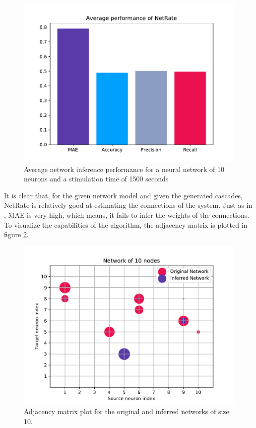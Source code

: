 \begin{figure}
	\centering
	\includegraphics[width=0.8\linewidth]{proof_suitability.pdf}
	\caption{Average network inference performance for a neural network of 10 neurons and a stimulation time of 1500 seconds}
	\label{fig:proof_suitability}
\end{figure}

It is clear that, for the given network model and given the generated cascades, NetRate is relatively good at estimating the connections of the system. Just as in \cite{alexandru2018estimating}, MAE is very high, which means, it fails to infer the weights of the connections. To visualize the capabilities of the algorithm, the adjacency matrix is plotted in figure \ref{fig:adjacency_10_neurons}.\\

\begin{figure}
	\centering
	\includegraphics[width=0.8\linewidth]{adjacency_matrix_10_neurons.pdf}
	\caption{Adjacency matrix plot for the original and inferred networks of size 10.}
	\label{fig:adjacency_10_neurons}
\end{figure}

